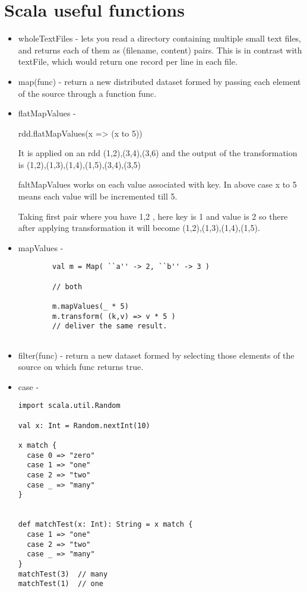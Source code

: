 \documentclass[paper=a4, fontsize=11pt]{scrartcl}
\numberwithin{equation}{section}		%
\numberwithin{figure}{section}			%
\numberwithin{table}{section}				%
\begin{document}
\section{Scala useful functions}
\begin{itemize}
	\item wholeTextFiles - lets you read a directory containing multiple small text files, and returns each of them as (filename, content) pairs. This is in contrast with textFile, which would return one record per line in each file.
	\item map(func) - return a new distributed dataset formed by passing each element of the source through a function func.  
	\item flatMapValues -

		rdd.flatMapValues(x => (x to 5))

		It is applied on an rdd {(1,2),(3,4),(3,6)} and the output of the transformation is {(1,2),(1,3),(1,4),(1,5),(3,4),(3,5)}

		faltMapValues works on each value associated with key. In above case {x to 5} means each value will be incremented till 5.

		Taking first pair where you have {1,2} , here key is 1 and value is 2 so there after applying transformation it will become (1,2),(1,3),(1,4),(1,5).
	\item mapValues - 
		\begin{lstlisting}
		val m = Map( ``a'' -> 2, ``b'' -> 3 )

		// both

		m.mapValues(_ * 5)
		m.transform( (k,v) => v * 5 )
		// deliver the same result.


		\end{lstlisting}
	\item filter(func) -  return a new dataset formed by selecting those elements of the source on which func returns true. 
	\item case -
		\begin{lstlisting}
import scala.util.Random

val x: Int = Random.nextInt(10)

x match {
  case 0 => "zero"
  case 1 => "one"
  case 2 => "two"
  case _ => "many"
}


def matchTest(x: Int): String = x match {
  case 1 => "one"
  case 2 => "two"
  case _ => "many"
}
matchTest(3)  // many
matchTest(1)  // one



\end{lstlisting}
\end{itemize}
\end{document}
